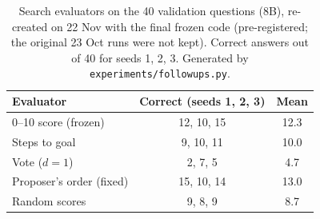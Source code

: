 \begin{table}[ht]
\centering
\small
\caption{Search evaluators on the 40 validation questions (8B), re-created on 22 Nov with the final frozen code (pre-registered; the original 23 Oct runs were not kept). Correct answers out of 40 for seeds 1, 2, 3. Generated by \texttt{experiments/followups.py}.}
\label{tab:validation-search}
\begin{tabular}{@{}lcc@{}}
\toprule
Evaluator & Correct (seeds 1, 2, 3) & Mean \\
\midrule
0--10 score (frozen) & 12, 10, 15 & 12.3 \\
Steps to goal & 9, 10, 11 & 10.0 \\
Vote ($d{=}1$) & 2, 7, 5 & 4.7 \\
Proposer's order (fixed) & 15, 10, 14 & 13.0 \\
Random scores & 9, 8, 9 & 8.7 \\
\bottomrule
\end{tabular}
\end{table}
